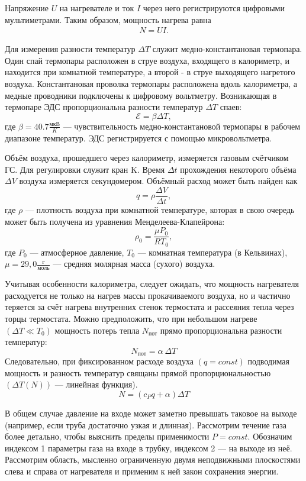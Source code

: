 \documentclass[a4paper, fontsize=14pt]{article}
\begin{document}
Напряжение $U$ на нагревателе и ток $I$ через него регистрируются цифровыми мультиметрами. Таким образом, мощность нагрева равна
\begin{align}
	N = UI.
\end{align}

Для измерения разности температур $\Delta T$ служит медно-константановая термопара. Один спай термопары расположен в струе воздуха, входящего в калориметр, и находится при комнатной температуре, а второй - в струе выходящего нагретого воздуха. Константановая проволка термопары расположена вдоль калориметра, а медные проводники подключены к цифровому вольтметру. Возникающая в термопаре ЭДС пропорциональна разности температур $\Delta T$ спаев:
\[
	\mathcal{E} = \beta \Delta T,	
\]
где $\beta = 40.7 \frac{\text{мкВ}}{K}$ --- чувствительность медно-константановой термопары в рабочем диапазоне температур. ЭДС регистрируется с помощью микровольтметра.

Объём воздуха, прошедшего через калориметр, измеряется газовым счётчиком ГС. Для регулировки служит кран K. Время $\Delta t$ прохождения некоторого объёма $\Delta V$ воздуха измеряется секундомером. Объёмный расход может быть найден как
\[
	q = \rho \frac{\Delta V}{\Delta t},
\]
где $ \rho $ --- плотность воздуха при комнатной температуре, которая в свою очередь может быть получена из уравнения Менделеева-Клапейрона:
\[
	\rho_0 = \frac{\mu P_0}{R T_0},
\]
где $P_0$ --- атмосферное давление, $T_0$ --- комнатная температура (в Кельвинах), $\mu = 29,0 \frac{\text{г}}{\text{моль}}$ --- средняя молярная масса (сухого) воздуха.

Учитывая особенности калориметра, следует ожидать, что мощность нагревателя расходуется не только на нагрев массы прокачиваемого воздуха, но и частично теряется за счёт нагрева внутренних стенок термостата и рассеяния тепла через торцы термостата. Можно предположить, что при небольшом нагреве $(\Delta T \ll T_0)$ мощность потерь тепла $N_{\text{пот}}$ прямо пропорциональна разности температур:
\[
	N_{\text{пот}}=\alpha\ \Delta T
\]
Следовательно, при фиксированном расходе воздуха $(q = const)$ подводимая мощность и разность температур свящаны прямой пропорциональностью $\left( \Delta T (N) \right)$ --- линейная функция).
\[
	N = (c_Pq+\alpha)\Delta T
\]

В общем случае давление
на входе может заметно превышать таковое на выходе
(например, если труба достаточно узкая и длинная). Рассмотрим течение газа более
детально, чтобы выяснить пределы применимости $P = const$. Обозначим индексом 1 параметры газа на входе в трубку, индексом 2 --- на выходе из неё. Рассмотрим область, мысленно ограниченную двумя неподвижными плоскостями слева и справа от нагревателя и применим к ней закон сохранения энергии.
\end{document}
